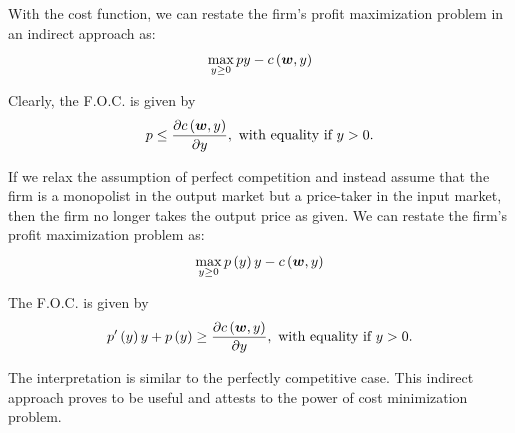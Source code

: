 




With the cost function, we can restate the firm's profit
maximization problem in an indirect approach as:
\[\max_{y\ge 0} py-c\left(\bm w,y\right)\]

Clearly, the F.O.C. is given by
\[p\le \frac{\partial c\left(\bm w,y\right)}{\partial y},\text{ with equality if }y>0.\]

If we relax the assumption of perfect competition and instead assume
that the firm is a monopolist in the output market but a price-taker in
the input market, then the firm no longer takes the output price as
given. We can restate the firm's profit maximization problem as:
\[\max_{y\ge 0}p\left(y\right)y-c\left(\bm w,y\right)\]

The F.O.C. is given by
\[p'\left(y\right) y + p\left(y\right) \ge \frac{\partial c\left(\bm w,y\right)}{\partial y},\text{ with equality if }y>0.\]

The interpretation is similar to the perfectly competitive case. This indirect approach proves to be useful and attests to the power of cost minimization problem.

